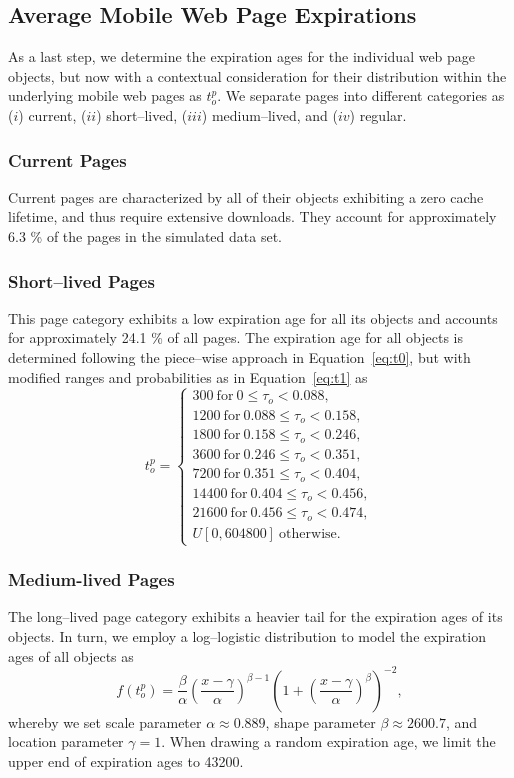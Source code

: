\documentclass[letterpaper,conference]{IEEEtran}
\begin{document}
\subsection{Average Mobile Web Page Expirations}
As a last step, we determine the expiration ages for the individual web page objects, but now with a contextual consideration for their distribution within the underlying mobile web pages as $t_o^p$.
We separate pages into different categories as ($i$) current, ($ii$) short--lived, ($iii$) medium--lived, and ($iv$) regular.

\subsubsection{Current Pages}
Current pages are characterized by all of their objects exhibiting a zero cache lifetime, and thus require extensive downloads. 
They account for approximately 6.3 \% of the pages in the simulated data set.

\subsubsection{Short--lived Pages}
This page category exhibits a low expiration age for all its objects and accounts for approximately 24.1 \% of all pages.
The expiration age for all objects is determined following the piece--wise approach in Equation~\ref{eq:t0}, but with modified ranges and probabilities as in Equation~\ref{eq:t1} as 
\begin{equation}\label{eq:t1}
t_o^p =
\begin{cases}
300 ~\mathrm{for}~ 0 \le \tau_o < 0.088, \\
1200 ~\mathrm{for}~ 0.088 \le \tau_o < 0.158, \\
1800 ~\mathrm{for}~0.158\le \tau_o < 0.246,\\
3600 ~\mathrm{for}~0.246 \le \tau_o < 0.351,\\
7200 ~\mathrm{for}~0.351 \le \tau_o < 0.404,\\
14400 ~\mathrm{for}~0.404 \le \tau_o < 0.456,\\
21600 ~\mathrm{for}~0.456 \le \tau_o < 0.474,\\
U[0, 604800]~\mathrm{otherwise}.
\end{cases}
\end{equation}

\subsubsection{Medium-lived Pages}
The long--lived page category exhibits a heavier tail for the expiration ages of its objects.
In turn, we employ a log--logistic distribution to model the expiration ages of all objects as 
\begin{equation*}
f(t_o^p)=\frac{\beta}{\alpha} \left(\frac{x-\gamma}{\alpha}\right)^{\beta-1}\left(1+\left(\frac{x-\gamma}{\alpha}\right)^\beta\right)^{-2},
\end{equation*}
whereby we set scale parameter $\alpha \approx 0.889 $, shape parameter $\beta \approx 2600.7$, and location parameter $\gamma=1$. 
When drawing a random expiration age, we limit the upper end of expiration ages to 43200.
\end{document}

